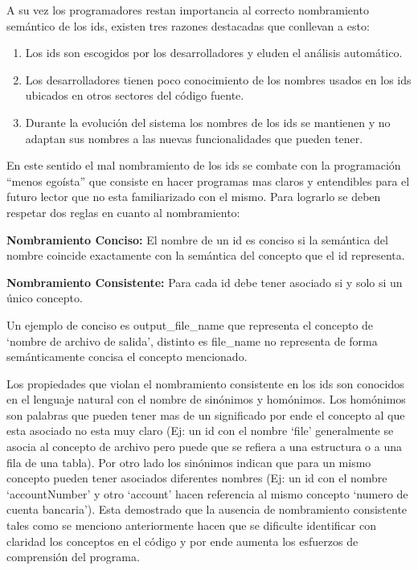 \documentclass[12pt]{report}
\begin{document}
A su vez los programadores restan importancia al correcto nombramiento semántico de los ids, existen tres razones destacadas que conllevan a esto:

\begin{enumerate}
\itemsep0em%
\item Los ids son escogidos por los desarrolladores y eluden el análisis automático.

\item Los desarrolladores tienen poco conocimiento de los nombres usados en los ids ubicados en otros sectores del código fuente.

\item Durante la evolución del sistema los nombres de los ids se mantienen y no adaptan sus nombres a las nuevas funcionalidades que pueden tener.
\end{enumerate}

En este sentido el mal nombramiento de los ids se combate con la programación “menos egoísta” que consiste en hacer programas mas claros y entendibles para el futuro lector que no esta familiarizado con el mismo. Para lograrlo se deben respetar dos reglas en cuanto al nombramiento\cite{DFPM05,DLHD06}:

\begin{framed}
\noindent \textbf{Nombramiento Conciso:} El nombre de un id es conciso si la semántica del nombre coincide exactamente con la semántica del concepto que el id representa.

\noindent \textbf{Nombramiento  Consistente:} Para cada id debe tener asociado si y solo si un único concepto.
\end{framed}

Un ejemplo de conciso es \textsf{output\_file\_name} que representa el concepto de `nombre de archivo de salida', distinto es \textsf{file\_name} no representa de forma semánticamente concisa el concepto mencionado.

Los propiedades que violan el nombramiento consistente en los ids son conocidos en el lenguaje natural con el nombre de sinónimos y homónimos. Los homónimos son palabras que pueden tener mas de un significado por ende el concepto al que esta asociado no esta muy claro (Ej: un id con el nombre `file' generalmente se asocia al concepto de archivo pero puede que se refiera a una estructura o a una fila de una tabla). Por otro lado los sinónimos indican que para un mismo concepto pueden tener asociados diferentes nombres (Ej: un id con el nombre `accountNumber' y otro `account' hacen referencia al mismo concepto `numero de cuenta bancaria'). Esta demostrado que la ausencia de nombramiento consistente tales como se menciono anteriormente hacen que se dificulte identificar con claridad los conceptos en el código y por ende aumenta los esfuerzos de comprensión del programa. 
\end{document}
